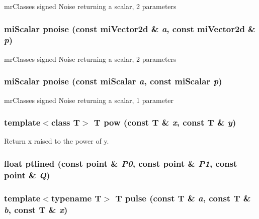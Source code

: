 mr\-Classes signed Noise returning a scalar, 2 parameters 

\subsubsection{\setlength{\rightskip}{0pt plus 5cm}mi\-Scalar pnoise (const mi\-Vector2d \& {\em a}, const mi\-Vector2d \& {\em p})\hspace{0.3cm}{\tt  [inline]}}\label{namespacersl_a99}


mr\-Classes signed Noise returning a scalar, 2 parameters 

\subsubsection{\setlength{\rightskip}{0pt plus 5cm}mi\-Scalar pnoise (const mi\-Scalar {\em a}, const mi\-Scalar {\em p})\hspace{0.3cm}{\tt  [inline]}}\label{namespacersl_a98}


mr\-Classes signed Noise returning a scalar, 1 parameter 

\subsubsection{\setlength{\rightskip}{0pt plus 5cm}template$<$class T$>$ T pow (const T \& {\em x}, const T \& {\em y})\hspace{0.3cm}{\tt  [inline]}}\label{namespacersl_a33}


Return x raised to the power of y. 

\subsubsection{\setlength{\rightskip}{0pt plus 5cm}float ptlined (const point \& {\em P0}, const point \& {\em P1}, const point \& {\em Q})\hspace{0.3cm}{\tt  [inline]}}\label{namespacersl_a153}


\subsubsection{\setlength{\rightskip}{0pt plus 5cm}template$<$typename T$>$ T pulse (const T \& {\em a}, const T \& {\em b}, const T \& {\em x})\hspace{0.3cm}{\tt  [inline]}}\label{namespacersl_a14}


